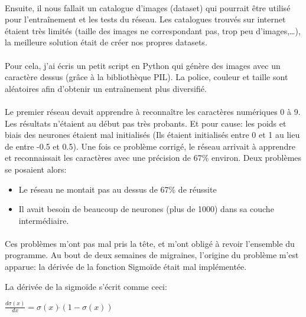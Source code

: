 \documentclass{article}
\begin{document}
\paragraph{}Ensuite, il nous fallait un catalogue d'images (dataset) qui pourrait être utilisé pour l'entraînement et les tests du réseau. Les catalogues trouvés sur internet étaient très limités (taille des images ne correspondant pas, trop peu d'images,…), la meilleure solution était de créer nos propres datasets.

\paragraph{}Pour cela, j'ai écris un petit script en Python qui génère des images avec un caractère dessus (grâce à la bibliothèque PIL). La police, couleur et taille sont aléatoires afin d'obtenir un entraînement plus diversifié.

\paragraph{}Le premier réseau devait apprendre à reconnaître les caractères numériques 0 à 9. Les résultats n'étaient au début pas très probants. Et pour cause: les poids et biais des neurones étaient mal initialisés (Ils étaient initialisés entre 0 et 1 au lieu de entre -0.5 et 0.5). Une fois ce problème corrigé, le réseau arrivait à apprendre et reconnaissait les caractères avec une précision de 67\% environ. Deux problèmes se posaient alors:

\begin{itemize}
	\item Le réseau ne montait pas au dessus de 67\% de réussite
	\item Il avait besoin de beaucoup de neurones (plus de 1000) dans sa couche intermédiaire.
\end{itemize}

\paragraph{} Ces problèmes m'ont pas mal pris la tête, et m'ont obligé à revoir l'ensemble du programme.
Au bout de deux semaines de migraines, l'origine du problème m'est apparue: la dérivée de la fonction Sigmoïde était mal implémentée.

La dérivée de la sigmoïde s'écrit comme ceci:

\begin{center}
	$\frac{d\sigma(x)}{dx} = \sigma(x)\dot{}(1 - \sigma(x))$
\end{center}
\end{document}
